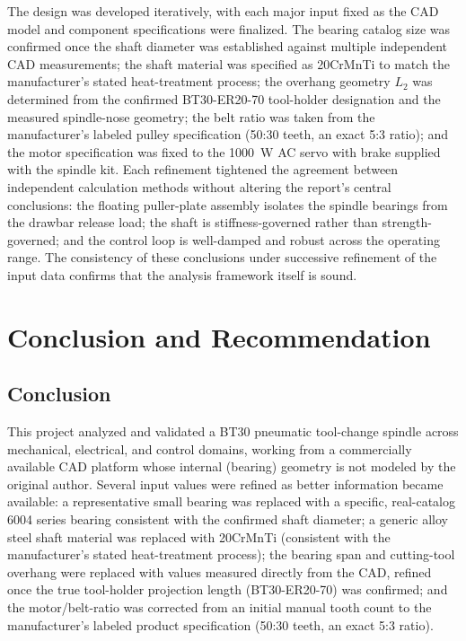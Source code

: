 \documentclass[12pt,a4paper]{report}
\begin{document}
	The design was developed iteratively, with each major input fixed as the CAD model and
	component specifications were finalized. The bearing catalog size was confirmed once the
	shaft diameter was established against multiple independent CAD measurements; the shaft
	material was specified as 20CrMnTi to match the manufacturer's stated heat-treatment
	process; the overhang geometry $L_2$ was determined from the confirmed BT30-ER20-70
	tool-holder designation and the measured spindle-nose geometry; the belt ratio was taken
	from the manufacturer's labeled pulley specification (50:30 teeth, an exact 5:3 ratio);
	and the motor specification was fixed to the 1000~W AC servo with brake supplied with the
	spindle kit. Each refinement tightened the agreement between independent calculation
	methods without altering the report's central conclusions: the floating puller-plate
	assembly isolates the spindle bearings from the drawbar release load; the shaft is
	stiffness-governed rather than strength-governed; and the control loop is well-damped and
	robust across the operating range. The consistency of these conclusions under successive
	refinement of the input data confirms that the analysis framework itself is sound.
	
	\chapter{Conclusion and Recommendation}
	
	\section{Conclusion}
	This project analyzed and validated a BT30 pneumatic tool-change spindle across mechanical,
	electrical, and control domains, working from a commercially available CAD platform whose
	internal (bearing) geometry is not modeled by the original author. Several input values
	were refined as better information became available: a representative small bearing was
	replaced with a specific, real-catalog 6004 series bearing consistent with the confirmed
	shaft diameter; a generic alloy steel shaft material was replaced with 20CrMnTi (consistent
	with the manufacturer's stated heat-treatment process); the bearing span and cutting-tool
	overhang were replaced with values measured directly from the CAD, refined once the true
	tool-holder projection length (BT30-ER20-70) was confirmed; and the motor/belt-ratio was
	corrected from an initial manual tooth count to the manufacturer's labeled product
	specification (50:30 teeth, an exact 5:3 ratio).
	
\end{document}
